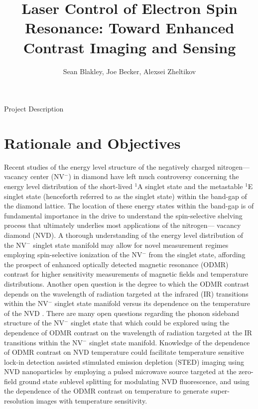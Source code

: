 \documentclass[11pt]{article}
\title{Laser Control of Electron Spin Resonance: Toward Enhanced Contrast Imaging and Sensing}
\author{Sean Blakley, Joe Becker, Alexsei Zheltikov}
\begin{document}
\begin{center}
\LARGE{Project Description}
\end{center}
\section{Rationale and Objectives}
Recent studies of the energy level structure of the negatively charged nitrogen—vacancy center (NV$^-$) in diamond have 
left much controversy concerning the energy level distribution of the short-lived $^1$A singlet state and the metastable $^1$E singlet state \cite{Goldman2015,Goldman2015a,Toyli2012} (henceforth referred to as the singlet state) within the band-gap 
of the diamond lattice.  The location of these energy states within the band-gap is of fundamental importance in the 
drive to understand the spin-selective shelving process that ultimately underlies most applications of the nitrogen—
vacancy diamond (NVD).  A thorough understanding of the energy level distribution of the NV$^-$ singlet state manifold may 
allow for novel measurement regimes employing spin-selective ionization of the NV$^-$ from the singlet state, affording 
the prospect of enhanced optically detected magnetic resonance (ODMR) contrast for higher sensitivity measurements 
of magnetic fields and temperature distributions.  Another open question is the degree to which the ODMR contrast 
depends on the wavelength of radiation targeted at the infrared (IR) transitions within the NV$^-$ singlet state 
manifold versus its dependence on the temperature of the NVD \cite{Blakley2016}.   There are many open questions regarding the phonon 
sideband structure of the NV$^-$ singlet state that which could be explored using the dependence of ODMR contrast on 
the wavelength of radiation targeted at the IR transitions within the NV$^-$ singlet state manifold.  Knowledge of the 
dependence of ODMR contrast on NVD temperature could facilitate temperature sensitive lock-in detection assisted stimulated emission depletion (STED) imaging using NVD nanoparticles by employing a pulsed microwave source 
targeted at the zero-field ground state sublevel splitting for modulating NVD fluorescence, and using the dependence of the ODMR contrast on temperature to generate super-resolution images with temperature sensitivity.
\end{document}
